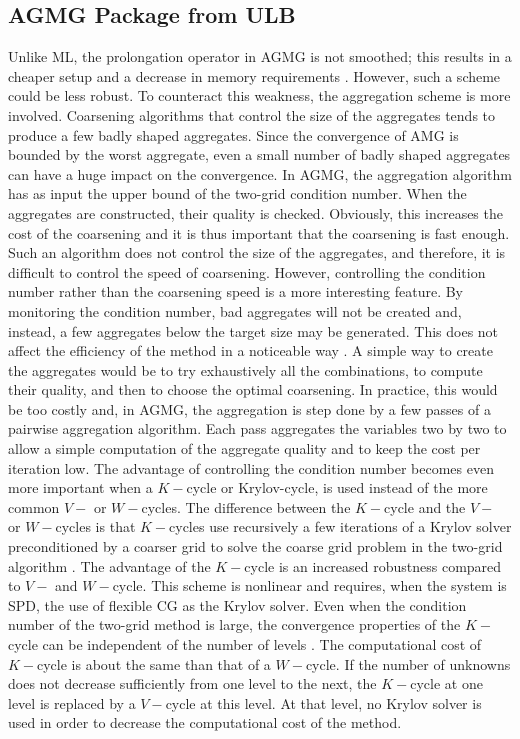 \subsection{AGMG Package from ULB}
Unlike ML, the prolongation operator in AGMG is not smoothed; this results in a
cheaper setup and a decrease in memory requirements \cite{agmg2}. However,
such a scheme could be less robust. To counteract this weakness, the
aggregation scheme is more involved. Coarsening algorithms that control
the size of the aggregates tends to produce a few badly shaped aggregates.
Since the convergence of AMG is bounded by the worst aggregate, even a small 
number of badly shaped aggregates can have a huge impact on
the convergence. In AGMG, the aggregation algorithm has as input the upper
bound of the two-grid condition number. When the aggregates are constructed,
their quality is checked. Obviously, this increases the cost of the coarsening
and it is thus important that the coarsening is fast enough. Such an 
algorithm does not control the size of the aggregates, and therefore, it is 
difficult to control the speed of coarsening. However, controlling the condition 
number rather than the coarsening speed is a more interesting feature. By 
monitoring the condition number, bad aggregates will not be created and, instead, 
a few aggregates below the target size may be generated. This  
does not affect the efficiency of the method in a noticeable way \cite{agmg2}. 
A simple way to create the aggregates would be to try exhaustively all the
combinations, to compute their quality, and then to choose the optimal
coarsening. In practice, this would be too costly and, in AGMG, the aggregation 
is step done by a few passes of a pairwise aggregation algorithm. Each pass
aggregates the variables two by two to allow a simple computation of the aggregate 
quality and to keep the cost per iteration low. The advantage of controlling the 
condition number becomes even more important when a $K-$cycle or Krylov-cycle, is 
used instead of the more common $V-$ or $W-$cycles. The difference between the 
$K-$cycle and the $V-$ or $W-$cycles is that $K-$cycles use recursively a 
few iterations of a Krylov solver preconditioned by a coarser grid to solve 
the coarse grid problem in the two-grid algorithm \cite{k_cycle}. The
advantage of the $K-$cycle is an increased robustness compared to $V-$ and
$W-$cycle. This scheme 
is nonlinear and requires, when the system is SPD, the use of flexible CG 
\cite{fcg,fcg_2,fcg_3,fcg_4} as the Krylov solver. Even when the condition 
number of the two-grid method is large, the convergence properties of the 
$K-$cycle can be independent of the number of levels \cite{k_cycle}. The 
computational cost of $K-$cycle is about the same than that of a $W-$cycle. 
If the number of unknowns does not decrease sufficiently from one 
level to the next, the $K-$cycle at one level is replaced by a $V-$cycle at 
this level. At that level, no Krylov solver is used in order to decrease the
computational cost of the method.

